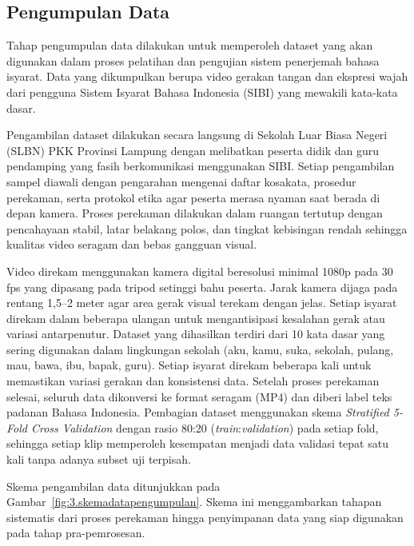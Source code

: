 \subsection{Pengumpulan Data} \label{III.Pengumpulan_Data}
Tahap pengumpulan data dilakukan untuk memperoleh dataset yang akan digunakan dalam proses pelatihan dan pengujian sistem penerjemah bahasa isyarat. Data yang dikumpulkan berupa video gerakan tangan dan ekspresi wajah dari pengguna Sistem Isyarat Bahasa Indonesia (SIBI) yang mewakili kata-kata dasar.\par
Pengambilan dataset dilakukan secara langsung di Sekolah Luar Biasa Negeri (SLBN) PKK Provinsi Lampung dengan melibatkan peserta didik dan guru pendamping yang fasih berkomunikasi menggunakan SIBI. Setiap pengambilan sampel diawali dengan pengarahan mengenai daftar kosakata, prosedur perekaman, serta protokol etika agar peserta merasa nyaman saat berada di depan kamera. Proses perekaman dilakukan dalam ruangan tertutup dengan pencahayaan stabil, latar belakang polos, dan tingkat kebisingan rendah sehingga kualitas video seragam dan bebas gangguan visual.\par
Video direkam menggunakan kamera digital beresolusi minimal 1080p pada 30 fps yang dipasang pada tripod setinggi bahu peserta. Jarak kamera dijaga pada rentang 1{,}5--2 meter agar area gerak visual terekam dengan jelas. Setiap isyarat direkam dalam beberapa ulangan untuk mengantisipasi kesalahan gerak atau variasi antarpenutur. Dataset yang dihasilkan terdiri dari 10 kata dasar yang sering digunakan dalam lingkungan sekolah (aku, kamu, suka, sekolah, pulang, mau, bawa, ibu, bapak, guru). Setiap isyarat direkam beberapa kali untuk memastikan variasi gerakan dan konsistensi data. Setelah proses perekaman selesai, seluruh data dikonversi ke format seragam (MP4) dan diberi label teks padanan Bahasa Indonesia. Pembagian dataset menggunakan skema \textit{Stratified 5-Fold Cross Validation} dengan rasio 80:20 (\textit{train}:\textit{validation}) pada setiap fold, sehingga setiap klip memperoleh kesempatan menjadi data validasi tepat satu kali tanpa adanya subset uji terpisah.\par
Skema pengambilan data ditunjukkan pada Gambar~\ref{fig:3.skemadatapengumpulan}. 
Skema ini menggambarkan tahapan sistematis dari proses perekaman hingga penyimpanan data 
yang siap digunakan pada tahap pra-pemrosesan.\par
